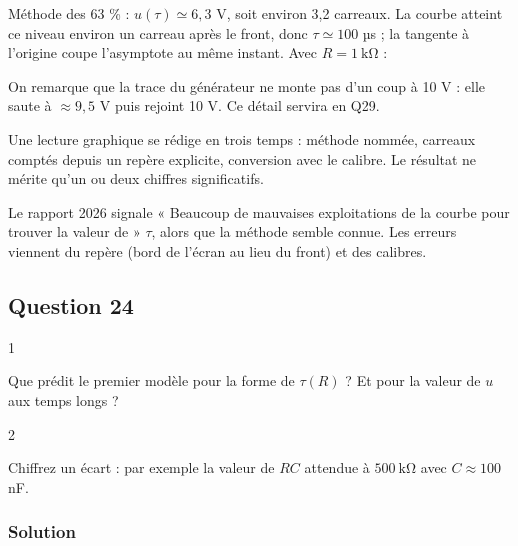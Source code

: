 \documentclass[11pt,a4paper]{article}
\newcommand{\equationajustee}[1]{%
  \sbox{\boiteequation}{$\displaystyle #1$}%
  \ifdim\wd\boiteequation>\linewidth
    \[\resizebox{\linewidth}{!}{\usebox{\boiteequation}}\]%
  \else
    \[#1\]%
  \fi}
\begin{document}
Méthode des 63 \% : \(u(\tau)\simeq6{,}3\) V, soit environ 3,2 carreaux. La courbe atteint ce niveau environ un carreau après le front, donc \(\tau\simeq100\) µs ; la tangente à l'origine coupe l'asymptote au même instant. Avec \(R=1\ \mathrm{k\Omega}\) :

\equationajustee{\boxed{C=\frac{\tau}{R}\simeq1\times10^{-7}\ \mathrm{F}=100\ \mathrm{nF}}}

On remarque que la trace du générateur ne monte pas d'un coup à 10 V : elle saute à \(\approx9{,}5\) V puis rejoint 10 V. Ce détail servira en Q29.

\begin{methode}

Une lecture graphique se rédige en trois temps : méthode nommée, carreaux comptés depuis un repère explicite, conversion avec le calibre. Le résultat ne mérite qu'un ou deux chiffres significatifs.

\end{methode}

\begin{jury}

Le rapport 2026 signale « Beaucoup de mauvaises exploitations de la courbe pour trouver la valeur de » \(\tau\), alors que la méthode semble connue. Les erreurs viennent du repère (bord de l'écran au lieu du front) et des calibres.

\end{jury}

\hypertarget{question-24}{%
\subsection{Question 24}\label{question-24}}

\begin{indication}{1}

Que prédit le premier modèle pour la forme de \(\tau(R)\) ? Et pour la valeur de \(u\) aux temps longs ?

\end{indication}

\begin{indication}{2}

Chiffrez un écart : par exemple la valeur de \(RC\) attendue à \(500\ \mathrm{k\Omega}\) avec \(C\approx100\) nF.

\end{indication}

\hypertarget{solution-23}{%
\subsubsection{Solution}\label{solution-23}}
\end{document}
